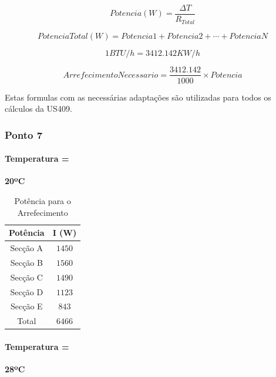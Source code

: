 \documentclass[12pt, a4paper]{article}
\begin{document}
\begin{equation}
	Potencia(W) =
	\dfrac{{\Delta} T}{R_{Total}}
\end{equation}

\begin{equation}
	PotenciaTotal(W) =
	Potencia1 +
	Potencia2 + \cdots +
	PotenciaN
\end{equation}

\begin{equation}
	1BTU/h = 3412.142KW/h
\end{equation}

\begin{equation}
	Arrefecimento Necessario = \dfrac{3412.142}{1000} \times Potencia
\end{equation}


Estas formulas com as necessárias adaptações são utilizadas para todos os cálculos da US409.

\subsubsection{Ponto 7}

\paragraph{Temperatura =}
\textbf{20ºC}

\begin{table}[htpb]
	\begin{center}
		\begin{tabular}{c c}
			\toprule
			Potência 								 & 	I (W) \\
			\midrule
			Secção A 						               	     & $1450$	 \\
			Secção B						               	     & $1560$	 \\
			Secção C						               	     & $1490$	 \\
			Secção D 						               	     & $1123$	 \\
			Secção E						               	  	 & $843$	 \\
			\hline
			Total						             & $6466$	 \\
			\bottomrule
		\end{tabular}
	\end{center}
	\caption{Potência para o Arrefecimento}\label{tab:arrefecimento20P7}
\end{table}

\paragraph{Temperatura =}
\textbf{28ºC}
\end{document}
